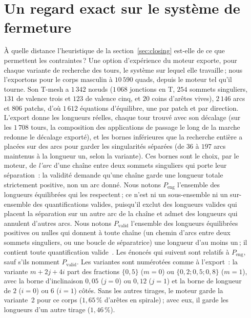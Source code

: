 \documentclass[11pt,a4paper]{article}
\begin{document}
\section{Un regard exact sur le système de fermeture}\label{sec:exact}

À quelle distance l'heuristique de la section~\ref{sec:closing} est-elle de
ce que permettent les contraintes\,? Une option d'expérience du moteur
exporte, pour chaque variante de recherche des tours, le système sur lequel
elle travaille\,; nous l'exportons pour le corps masculin à $10\,590$
quads, depuis le moteur tel qu'il tourne. Son T-mesh a $1\,342$ nœuds
($1\,068$ jonctions en T, $254$ sommets singuliers, $131$ de valence trois
et $123$ de valence cinq, et $20$ coins d'arêtes vives), $2\,146$ arcs et
$806$ patchs, d'où $1\,612$ équations d'équilibre, une par patch et par
direction. L'export donne les longueurs réelles, chaque tour trouvé avec son
décalage (sur les $1\,708$ tours, la composition des applications de
passage le long de la marche redonne le décalage exporté), et les bornes
inférieures que la recherche entière a placées sur des arcs pour garder les
singularités séparées (de $36$ à $197$ arcs maintenus à la longueur un,
selon la variante). Ces bornes sont le choix, par le moteur,
de \emph{l'arc} d'une chaîne entre deux sommets singuliers qui porte leur
séparation~: la validité demande qu'une chaîne garde une longueur totale
strictement positive, non un arc donné. Nous notons $P_{\mathrm{eng}}$ l'ensemble des
longueurs équilibrées qui les respectent\,; ce n'est ni un sous-ensemble ni
un sur-ensemble des quantifications valides, puisqu'il exclut des longueurs
valides qui placent la séparation sur un autre arc de la chaîne et admet des
longueurs qui annulent d'autres arcs. Nous notons $P_{\mathrm{valid}}$
l'ensemble des longueurs équilibrées positives ou nulles qui donnent à toute
chaîne (un chemin d'arcs entre deux sommets singuliers, ou une boucle de
séparatrice) une longueur d'au moins un\,; il contient toute quantification
valide~\cite{gardent2026turns}. Les énoncés qui suivent sont relatifs à
$P_{\mathrm{eng}}$, sauf s'ils nomment $P_{\mathrm{valid}}$. Les variantes sont numérotées comme à
l'export~: la variante $m + 2j + 4i$ part des fractions $\{0,5\}$ ($m = 0$)
ou $\{0,2 ; 0,5 ; 0,8\}$ ($m = 1$), avec la borne d'inclinaison $0,05$ ($j =
0$) ou $0,12$ ($j = 1$) et la borne de longueur de $2$ ($i = 0$) ou $6$ ($i =
1$) côtés. Sans les autres tirages, le moteur garde la variante~2 pour ce
corps ($1,65\,\%$ d'arêtes en spirale)\,; avec eux, il garde les longueurs
d'un autre tirage ($1,46\,\%$).
\end{document}
